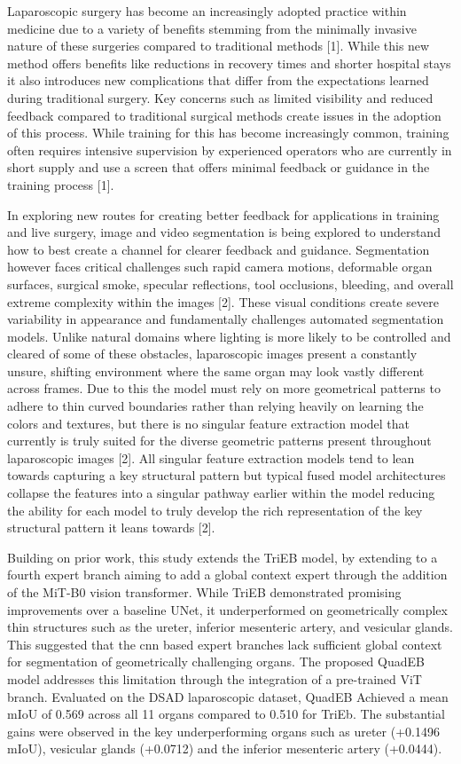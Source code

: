 \documentclass[twocolumn]{article}
\begin{document}
Laparoscopic surgery has become an increasingly adopted practice within medicine due to a variety of benefits stemming  from the minimally invasive nature of these surgeries compared to traditional methods [1]. While this new method offers benefits like reductions in recovery times and shorter hospital stays it also introduces new complications that differ from the expectations learned during traditional surgery. Key concerns such as limited visibility and reduced feedback compared to traditional surgical methods create issues in the adoption of this process. While training for this has become increasingly common, training often requires intensive supervision by experienced operators who are currently in short supply and use a screen that offers minimal feedback or guidance in the training process [1]. 

In exploring new routes for creating better feedback for applications in training and live surgery, image and video segmentation is being explored to understand how to best create a channel for clearer feedback and guidance. Segmentation however faces critical challenges such rapid camera motions, deformable organ surfaces, surgical smoke, specular reflections, tool occlusions, bleeding, and overall extreme complexity within the images [2]. These visual conditions create severe variability in appearance and fundamentally challenges automated segmentation models. Unlike natural domains where lighting is more likely to be controlled and cleared of some of these obstacles, laparoscopic images present a constantly unsure, shifting environment where the same organ may look vastly different across frames. Due to this the model must rely on more geometrical patterns to adhere to thin curved boundaries rather than relying heavily on learning the colors and textures, but there is no singular feature extraction model that currently is truly suited for the diverse geometric patterns present throughout laparoscopic images [2]. All singular feature extraction models tend to lean towards capturing a key structural pattern but typical fused model architectures collapse the features into a singular pathway earlier within the model reducing the ability for each model to truly develop the rich representation of the key structural pattern it leans towards [2].

Building on prior work, this study extends the TriEB model, by extending to a fourth expert branch aiming to add a global context expert through the addition of the MiT-B0 vision transformer. While TriEB  demonstrated promising improvements over a baseline UNet, it underperformed on geometrically complex thin structures such as the ureter, inferior mesenteric artery, and vesicular glands. This suggested that the cnn based expert branches lack sufficient global context for segmentation of geometrically challenging organs. The proposed QuadEB model addresses this limitation through the integration of a pre-trained ViT branch. Evaluated on the DSAD laparoscopic dataset, QuadEB Achieved a mean mIoU of 0.569 across all 11 organs compared to 0.510 for TriEb. The substantial gains were observed in the key underperforming organs such as ureter (+0.1496 mIoU), vesicular glands (+0.0712) and the inferior mesenteric artery (+0.0444). 
\end{document}
